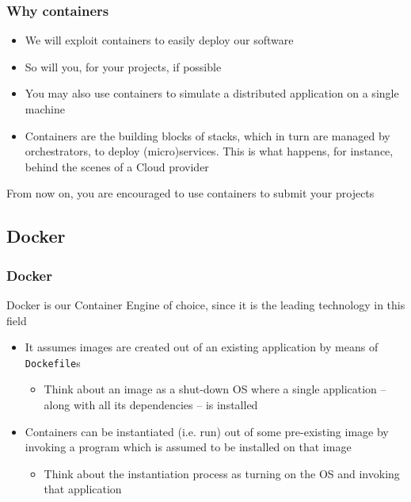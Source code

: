 \documentclass{beamer}\mode<presentation>{\usetheme{AMSBolognaFC}}
\begin{document}
\begin{frame}
\frametitle{Why containers}

    \begin{itemize}
        \item We will exploit containers to easily deploy our software

        \item So will you, for your projects, if possible

        \item You may also use containers to simulate a distributed application on a single machine

        \item Containers are the building blocks of \alert{stacks}, which in turn are managed by \alert{orchestrators}, to deploy (\alert{micro})\alert{services}.
        This is what happens, for instance, behind the scenes of a \alert{Cloud} provider

    \end{itemize}

    \vspace{.3cm}

    \begin{block}{}
        \alert{From now on}, you are \alert{encouraged} to use containers to submit your projects
    \end{block}

\end{frame}

\subsection{Docker}

\begin{frame}
\frametitle{Docker}

    Docker is our Container Engine of choice, since it is the leading technology in this field
    \vfill
    \begin{itemize}
        \item It assumes images are created out of an existing application by means of \alert{\texttt{Dockefile}s}

        \begin{itemize}
            \item Think about an image as a shut-down OS where a single application -- along with all its dependencies -- is installed
        \end{itemize}

        \vfill

        \item Containers can be instantiated (i.e. \alert{run}) out of some pre-existing image by invoking a program which is assumed to be installed on that image

        \begin{itemize}
            \item Think about the instantiation process as turning on the OS and invoking that application
        \end{itemize}

    \end{itemize}

\end{frame}
\end{document}
